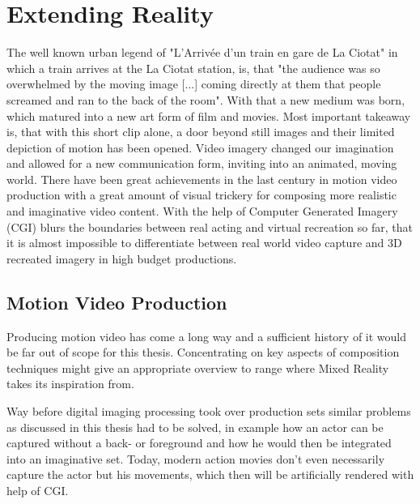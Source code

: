 %
\chapter{Extending Reality}
\label{sec:extendingreality}


The well known urban legend of "L'Arriv\'ee d'un train en gare de La Ciotat" in 
which a train arrives at the La Ciotat station, is, that "the audience was so 
overwhelmed by the moving image [...] coming directly at them that people 
screamed and ran to the back of the room". \cite{wiki:train:2017} With that a 
new medium was born, which matured into a new art form of film and movies.
\newline
Most important takeaway is, that with this short clip alone, a door beyond 
still images and their limited depiction of motion has been opened. Video 
imagery changed our imagination and allowed for a new communication form, 
inviting into an animated, moving world. There have been great achievements in 
the last century in motion video production with a great amount of visual 
trickery for composing more realistic and imaginative video content. With the 
help of Computer Generated Imagery (CGI) blurs the boundaries between real 
acting and virtual recreation so far, that it is almost impossible to 
differentiate between real world video capture and 3D recreated imagery in high 
budget productions.

\section{Motion Video Production}

Producing motion video has come a long way and a sufficient history of it would 
be far out of scope for this thesis. Concentrating on key aspects of 
composition techniques might give an appropriate overview to range where Mixed 
Reality takes its inspiration from.

Way before digital imaging processing took over production sets similar 
problems as discussed in this thesis had to be solved, in example how an actor 
can be captured without a back- or foreground and how he would then be 
integrated into an imaginative set. Today, modern action movies don't even 
necessarily capture the actor but his movements, which then will be 
artificially rendered with help of CGI. 

